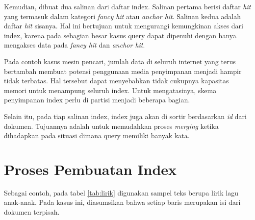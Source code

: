 Kemudian, dibuat dua salinan dari daftar index. Salinan pertama berisi daftar
\emph{hit} yang termasuk dalam kategori \emph{fancy hit} atau \emph{anchor hit}.
Salinan kedua adalah daftar \emph{hit} sisanya. Hal ini bertujuan untuk
mengurangi kemungkinan akses dari index, karena pada sebagian besar kasus query
dapat dipenuhi dengan hanya mengakses data pada \emph{fancy hit} dan
\emph{anchor hit}.

Pada contoh kasus mesin pencari, jumlah data di seluruh internet yang terus
bertambah membuat potensi penggunaan media penyimpanan menjadi hampir tidak
terbatas. Hal tersebut dapat menyebabkan tidak cukupnya kapasitas memori untuk
menampung seluruh index. Untuk mengatasinya, skema penyimpanan index perlu di
partisi menjadi beberapa bagian.

Selain itu, pada tiap salinan index, index juga akan di sortir berdasarkan
\emph{id} dari dokumen. Tujuannya adalah untuk memudahkan proses \emph{merging}
ketika dihadapkan pada situasi dimana query memiliki banyak kata.

%

\section{Proses Pembuatan Index}

Sebagai contoh, pada tabel \ref{tab:lirik} digunakan sampel teks berupa lirik
lagu anak-anak. Pada kasus ini, diasumsikan bahwa setiap baris merupakan isi
dari dokumen terpisah.

